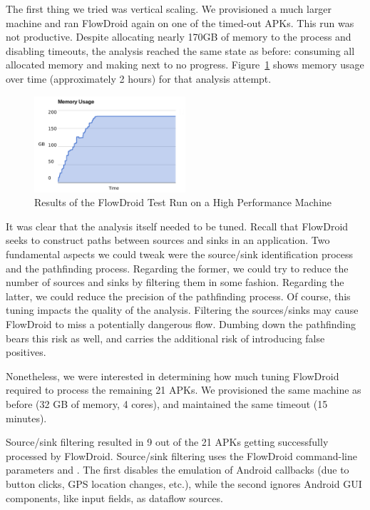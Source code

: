 The first thing we tried was vertical scaling.  We provisioned a much larger machine and ran FlowDroid again on one of the timed-out APKs.  This run was not productive.  Despite allocating nearly 170GB of memory to the process and disabling timeouts, the analysis reached the same state as before: consuming all allocated memory and making next to no progress.  Figure~\ref{fig:high_phase1} shows memory usage over time (approximately 2 hours) for that analysis attempt.

\begin{figure}[h]
	\centering
	\includegraphics[width=0.50\textwidth]{flowdroid_perf.pdf}
	\caption{Results of the FlowDroid Test Run on a High Performance Machine}
	\label{fig:high_phase1}
\end{figure}

It was clear that the analysis itself needed to be tuned.  Recall that FlowDroid seeks to construct paths between sources and sinks in an application.  Two fundamental aspects we could tweak were the source/sink identification process and the pathfinding process.  Regarding the former, we could try to reduce the number of sources and sinks by filtering them in some fashion.  Regarding the latter, we could reduce the precision of the pathfinding process.  Of course, this tuning impacts the quality of the analysis.  Filtering the sources/sinks may cause FlowDroid to miss a potentially dangerous flow.  Dumbing down the pathfinding bears this risk as well, and carries the additional risk of introducing false positives. 

Nonetheless, we were interested in determining how much tuning FlowDroid required to process the remaining 21 APKs.  We provisioned the same machine as before (32 GB of memory, 4 cores), and maintained the same timeout (15 minutes).  

Source/sink filtering resulted in 9 out of the 21 APKs getting successfully processed by FlowDroid. Source/sink filtering uses the FlowDroid command-line parameters  and . The first disables the emulation of Android callbacks (due to button clicks, GPS location changes, etc.), while the second ignores Android GUI components, like input fields, as dataflow sources.

